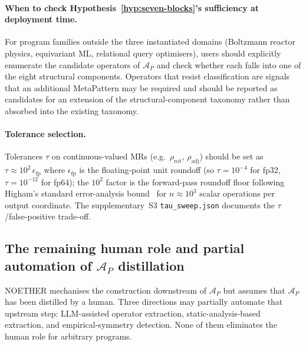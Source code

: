 \documentclass[acmsmall,screen,review]{acmart}
\begin{document}
\paragraph{When to check Hypothesis~\ref{hyp:seven-blocks}'s sufficiency at deployment time.} For program families outside the three instantiated domains (Boltzmann reactor physics, equivariant ML, relational query optimisers), users should explicitly enumerate the candidate operators of $\mathcal{A}_P$ and check whether each falls into one of the eight structural components. Operators that resist classification are signals that an additional MetaPattern may be required and should be reported as candidates for an extension of the structural-component taxonomy rather than absorbed into the existing taxonomy.

\paragraph{Tolerance selection.} Tolerances $\tau$ on continuous-valued MRs (e.g.\ $\rho_{\mathrm{rot}}$, $\rho_{\mathrm{adj}}$) should be set as $\tau \approx 10^{2}\, \epsilon_{\mathrm{fp}}$ where $\epsilon_{\mathrm{fp}}$ is the floating-point unit roundoff (so $\tau = 10^{-4}$ for fp32, $\tau = 10^{-12}$ for fp64); the $10^{2}$ factor is the forward-pass roundoff floor following Higham's standard error-analysis bound~\cite{Higham2002Accuracy} for $n \approx 10^{3}$ scalar operations per output coordinate. The supplementary~S3 \texttt{tau\_sweep.json} documents the $\tau$/false-positive trade-off.

\subsection{The remaining human role and partial automation of \texorpdfstring{$\mathcal{A}_P$}{A\_P} distillation}
\label{subsec:remaining-human-role}

NOETHER mechanises the construction downstream of $\mathcal{A}_P$ but assumes that $\mathcal{A}_P$ has been distilled by a human. Three directions may partially automate that upstream step: LLM-assisted operator extraction, static-analysis-based extraction, and empirical-symmetry detection. None of them eliminates the human role for arbitrary programs.
\end{document}
